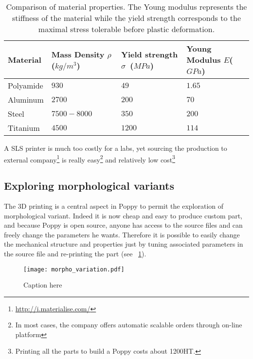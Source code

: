 \begin{table}[h]
    \centering
    \begin{tabularx}{0.8\linewidth }{l X X X}
        Material & Mass Density $\rho$ ($kg/m^3$) &  Yield strength $\sigma$~($MPa$) & Young Modulus $E$($GPa$)\\
        \hline
        Polyamide & $930$ & $49$ & $1.65$\\

        Aluminum & $2700$ & $200$ & $70$\\

        Steel & $7500-8000$ & $350$ & $200$\\

        Titanium & $4500$ & $1200$ & $114$\\

    \end{tabularx}

    \caption{Comparison of material properties.
    The Young modulus represents the stiffness of the material while the yield strength corresponds to the maximal stress tolerable before plastic deformation.}
    \label{tab:materials}
\end{table}

A SLS printer is much too costly for a labs, yet sourcing the production to external company\footnote{\url{http://i.materialise.com/}} is really easy\footnote{In most cases, the company offers automatic scalable orders through on-line platform} and relatively low cost\footnote{Printing all the parts to build a Poppy costs about 1200\texteuro HT.}

\subsection{Exploring morphological variants} %
The 3D printing is a central aspect in Poppy to permit the exploration of morphological variant. Indeed it is now cheap and easy to produce custom part, and because Poppy is open source, anyone has access to the source files and can freely change the parameters he wants. Therefore it is possible to easily change the mechanical structure and properties just by tuning associated parameters in the source file and re-printing the part (see \figurename~\ref{fig:exploring-morpho-poppy}).

\begin{figure}[h]
    \begin{center}
        \texttt{[image: morpho\_variation.pdf]}
    \end{center}
    \caption{Caption here}
    \label{fig:exploring-morpho-poppy}
\end{figure}


